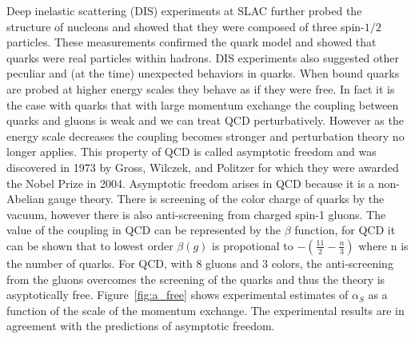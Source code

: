 Deep inelastic scattering (DIS) experiments at SLAC further probed the structure of nucleons and showed that they were composed of three spin-$1/2$ particles. These measurements confirmed the quark model and showed that quarks were real particles within hadrons. DIS experiments also suggested other peculiar and (at the time) unexpected behaviors in quarks. When bound quarks are probed at higher energy scales they behave as if they were free. In fact it is the case with quarks that with large momentum exchange the coupling between quarks and gluons is weak and we can treat QCD perturbatively. However as the energy scale decreases the coupling becomes stronger and perturbation theory no longer applies. This property of QCD is called asymptotic freedom and was discovered in 1973 by Gross, Wilczek, and Politzer for which they were awarded the Nobel Prize in 2004. Asymptotic freedom arises in QCD because it is a non-Abelian gauge theory. There is screening of the color charge of quarks by the vacuum, however there is also anti-screening from charged spin-1 gluons. The value of the coupling in QCD can be represented by the $\beta$ function, for QCD it can be shown that to lowest order $\beta(g)$ is propotional to $-(\frac{11}{2} - \frac{n}{3})$ where n is the number of quarks. For QCD, with 8 gluons and 3 colors, the anti-screening from the gluons overcomes the screening of the quarks and thus the theory is asyptotically free. Figure~\ref{fig:a_free} shows experimental estimates of $\alpha_S$ as a function of the scale of the momentum exchange. The experimental results are in agreement with the predictions of asymptotic freedom. 

